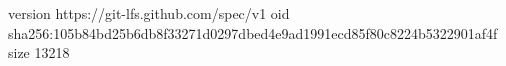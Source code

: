 version https://git-lfs.github.com/spec/v1
oid sha256:105b84bd25b6db8f33271d0297dbed4e9ad1991ecd85f80c8224b5322901af4f
size 13218
